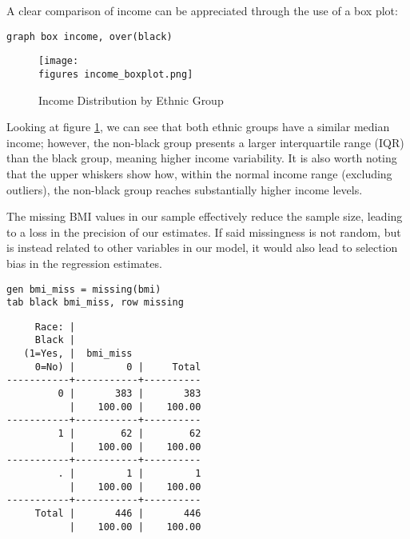\newpage


A clear comparison of income can be appreciated through the use of a box plot:

\begin{verbatim}
graph box income, over(black)
\end{verbatim}

\begin{figure}[H]
  \centering
  \texttt{[image: \\figures income\_boxplot.png]}\hspace{4em}
  \caption{Income Distribution by Ethnic Group}
  \label{fig:income_boxplot}
\end{figure}

Looking at figure \ref{fig:income_boxplot}, we can see that both ethnic groups have a similar median income; however, the non-black group presents a larger interquartile range (IQR) than the black group, meaning higher income variability. It is also worth noting that the upper whiskers show how, within the normal income range (excluding outliers), the non-black group reaches substantially higher income levels.


The missing BMI values in our sample effectively reduce the sample size, leading to a loss in the precision of our estimates. If said missingness is not random, but is instead related to other variables in our model, it would also lead to selection bias in the regression estimates.

\newpage

\begin{verbatim}
gen bmi_miss = missing(bmi)
tab black bmi_miss, row missing
\end{verbatim}

\begin{verbatim}
     Race: |
     Black |
   (1=Yes, |  bmi_miss
     0=No) |         0 |     Total
-----------+-----------+----------
         0 |       383 |       383 
           |    100.00 |    100.00 
-----------+-----------+----------
         1 |        62 |        62 
           |    100.00 |    100.00 
-----------+-----------+----------
         . |         1 |         1 
           |    100.00 |    100.00 
-----------+-----------+----------
     Total |       446 |       446 
           |    100.00 |    100.00 
\end{verbatim}

